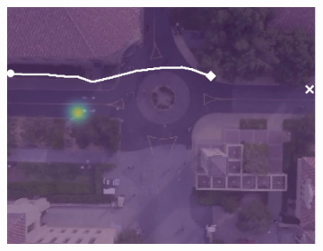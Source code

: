 \documentclass[letterpaper,10pt,conference]{ieeetran}
\begin{document}
\begin{figure}[t!]
\begin{subfigure}[t]{0.48\textwidth}
\begin{minipage}[c]{0.3\linewidth}
		\includegraphics[width=\linewidth]{./figures/comparison/lstm_1_2_t=380.jpg}
	\end{minipage}
	

\end{subfigure}
\end{figure}
\end{document}
